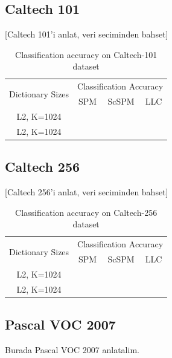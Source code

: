 \documentclass[conference]{IEEEtran}
\begin{document}
\subsection{Caltech 101}

[Caltech 101'i anlat, veri seciminden bahset]

\begin{table}[ph]
  \centering
  \begin{tabular}{|c|c|c|c|}
    \hline
    \multirow{2}{*}{Dictionary Sizes} & \multicolumn{3}{c|}{Classification Accuracy} \\
    \cline{2-4}
    & SPM & ScSPM & LLC \\
    \hline
     L2, K=1024 & & & \\
    \hline
     L2, K=1024 & & & \\
    \hline
  \end{tabular}
  \caption{Classification accuracy on Caltech-101 dataset }
  \label{tablo}
\end{table}

\subsection{Caltech 256} 

[Caltech 256'i anlat, veri seciminden bahset]

\begin{table}[ph]
  \centering
  \begin{tabular}{|c|c|c|c|}
    \hline
    \multirow{2}{*}{Dictionary Sizes} & \multicolumn{3}{c|}{Classification Accuracy} \\
    \cline{2-4}
    & SPM & ScSPM & LLC \\
    \hline
     L2, K=1024 & & & \\
    \hline
     L2, K=1024 & & & \\
    \hline
  \end{tabular}
  \caption{Classification accuracy on Caltech-256 dataset }
  \label{tablo}
\end{table}

\subsection{Pascal VOC 2007}

Burada Pascal VOC 2007 anlatalim.
\end{document}

